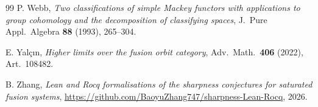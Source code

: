 \documentclass[10pt]{amsart}
\theoremstyle{definition}
\numberwithin{equation}{section}
\begin{document}
\begin{thebibliography}{99}
P. Webb,
{\it Two classifications of simple Mackey functors with applications to group cohomology and the decomposition of classifying spaces},
J.\ Pure Appl.\ Algebra \textbf{88} (1993), 265--304.

E. Yal\c{c}\i{}n,
{\it Higher limits over the fusion orbit category},
Adv.\ Math.\ \textbf{406} (2022), Art.~108482.

B. Zhang,
{\it Lean and Rocq formalisations of the sharpness conjectures for saturated fusion systems},\newline
\url{https://github.com/BaoyuZhang747/sharpness-Lean-Rocq}, 2026.

\end{thebibliography}
\end{document}
